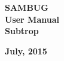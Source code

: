 \documentclass[11pt,a4paper,titlepage]{article}
\begin{document}

\begin{titlepage}
	
	
	\begin{center}
		\vspace*{-3cm}
	\end{center}
	
	
    \vspace*{2cm}
      \Huge \textbf {SAMBUG}\\
      
    \vspace*{-0.5cm}
	  \huge \textbf {User Manual}\\
	  
	\vspace*{-0.5cm}  
      \LARGE \textbf {Subtrop}
         
    \vskip2cm
          
    
    \large \textbf{July, 2015}
    \vfill
\end{titlepage}
	
	

\tableofcontents

\pagebreak
\end{document}
